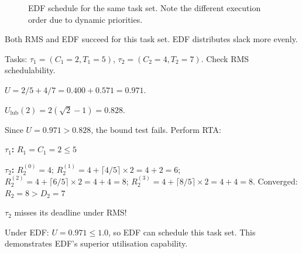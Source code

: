 \begin{example}
\begin{solution}
\begin{figure}[H]
\caption{EDF schedule for the same task set. Note the different execution order due to dynamic priorities.}
\label{fig:sched:gantt-edf}
\end{figure}

Both RMS and EDF succeed for this task set. EDF distributes slack more evenly.
\end{solution}
\end{example}

\begin{example}
Tasks: $\tau_1 = (C_1=2, T_1=5)$, $\tau_2 = (C_2=4, T_2=7)$. Check RMS schedulability.

\begin{solution}
$U = 2/5 + 4/7 = 0.400 + 0.571 = 0.971$.

$U_{\mathrm{lub}}(2) = 2(\sqrt{2}-1) = 0.828$.

Since $U = 0.971 > 0.828$, the bound test fails. Perform RTA:

\textbf{$\tau_1$:} $R_1 = C_1 = 2 \leq 5$ \checkmark

\textbf{$\tau_2$:} $R_2^{(0)} = 4$; $R_2^{(1)} = 4 + \lceil 4/5\rceil \times 2 = 4 + 2 = 6$; $R_2^{(2)} = 4 + \lceil 6/5\rceil \times 2 = 4 + 4 = 8$; $R_2^{(3)} = 4 + \lceil 8/5\rceil \times 2 = 4 + 4 = 8$. Converged: $R_2 = 8 > D_2 = 7$ {\color{ee-red}}

$\tau_2$ misses its deadline under RMS!

Under EDF: $U = 0.971 \leq 1.0$, so EDF can schedule this task set. This demonstrates EDF's superior utilisation capability.
\end{solution}
\end{example}

